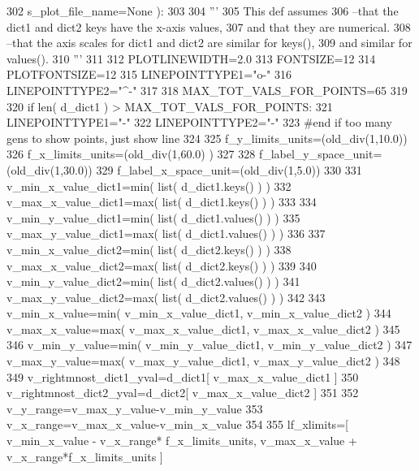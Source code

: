 \begin{DoxyCode}
302                                             s\_plot\_file\_name=\textcolor{keywordtype}{None} ):
303 
304     \textcolor{stringliteral}{'''}
305 \textcolor{stringliteral}{    This def assumes }
306 \textcolor{stringliteral}{        --that the dict1 and dict2 keys have the x-axis values,}
307 \textcolor{stringliteral}{        and that they are numerical.}
308 \textcolor{stringliteral}{        --that the axis scales for dict1 and dict2 are similar for keys(),}
309 \textcolor{stringliteral}{        and similar for values().}
310 \textcolor{stringliteral}{    '''}
311 
312     PLOTLINEWIDTH=2.0
313     FONTSIZE=12
314     PLOTFONTSIZE=12
315     LINEPOINTTYPE1=\textcolor{stringliteral}{"o-"}
316     LINEPOINTTYPE2=\textcolor{stringliteral}{"^-"}
317 
318     MAX\_TOT\_VALS\_FOR\_POINTS=65
319 
320     \textcolor{keywordflow}{if} len( d\_dict1 ) > MAX\_TOT\_VALS\_FOR\_POINTS:
321         LINEPOINTTYPE1=\textcolor{stringliteral}{"-"}
322         LINEPOINTTYPE2=\textcolor{stringliteral}{"-"}
323     \textcolor{comment}{#end if too many gens to show points, just show line}
324 
325     f\_y\_limits\_units=(old\_div(1,10.0))
326     f\_x\_limits\_units=(old\_div(1,60.0) )
327 
328     f\_label\_y\_space\_unit=(old\_div(1,30.0))
329     f\_label\_x\_space\_unit=(old\_div(1,5.0))
330 
331     v\_min\_x\_value\_dict1=min( list( d\_dict1.keys() ) )
332     v\_max\_x\_value\_dict1=max( list( d\_dict1.keys() ) )
333 
334     v\_min\_y\_value\_dict1=min( list( d\_dict1.values() ) )
335     v\_max\_y\_value\_dict1=max( list( d\_dict1.values() ) )
336 
337     v\_min\_x\_value\_dict2=min( list( d\_dict2.keys() ) )
338     v\_max\_x\_value\_dict2=max( list( d\_dict2.keys() ) )
339 
340     v\_min\_y\_value\_dict2=min( list( d\_dict2.values() ) )
341     v\_max\_y\_value\_dict2=max( list( d\_dict2.values() ) )
342 
343     v\_min\_x\_value=min( v\_min\_x\_value\_dict1, v\_min\_x\_value\_dict2 )
344     v\_max\_x\_value=max( v\_max\_x\_value\_dict1, v\_max\_x\_value\_dict2 )
345 
346     v\_min\_y\_value=min( v\_min\_y\_value\_dict1, v\_min\_y\_value\_dict2 )
347     v\_max\_y\_value=max( v\_max\_y\_value\_dict1, v\_max\_y\_value\_dict2 )
348 
349     v\_rightmnost\_dict1\_yval=d\_dict1[ v\_max\_x\_value\_dict1 ] 
350     v\_rightmnost\_dict2\_yval=d\_dict2[ v\_max\_x\_value\_dict2 ]
351 
352     v\_y\_range=v\_max\_y\_value-v\_min\_y\_value
353     v\_x\_range=v\_max\_x\_value-v\_min\_x\_value
354 
355     lf\_xlimits=[ v\_min\_x\_value - v\_x\_range* f\_x\_limits\_units, v\_max\_x\_value + v\_x\_range*f\_x\_limits\_units ]

\end{DoxyCode}
